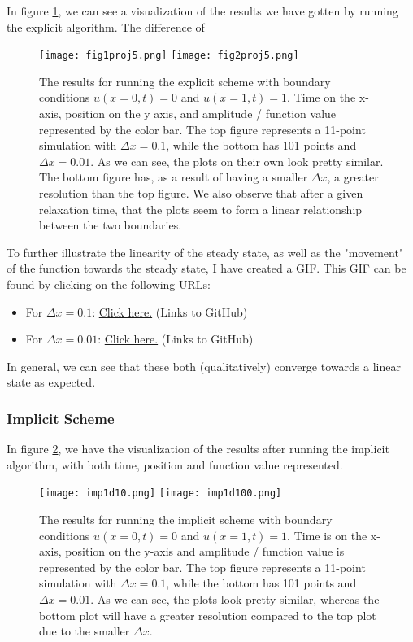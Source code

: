 \documentclass[reprint,english,notitlepage]{revtex4-1}  %
\begin{document}
In figure \ref{fig:1Dexplicit}, we can see a visualization of the results we have gotten by running the explicit algorithm. The difference of

\begin{figure}[h!]
    \centering
    \texttt{[image: fig1proj5.png]}
    \texttt{[image: fig2proj5.png]}
    \caption{The results for running the explicit scheme with boundary conditions $u(x=0,t) = 0$ and $u(x=1,t) = 1$. Time on the x-axis, position on the y axis, and amplitude / function value represented by the color bar. The top figure represents a 11-point simulation with $\Delta x = 0.1$, while the bottom has 101 points and $\Delta x = 0.01$. As we can see, the plots on their own look pretty similar. The bottom figure has, as a result of having a smaller $\Delta x$, a greater resolution than the top figure. We also observe that after a given relaxation time, that the plots seem to form a linear relationship between the two boundaries.}
    \label{fig:1Dexplicit}
\end{figure}

To further illustrate the linearity of the steady state, as well as the "movement" of the function towards the steady state, I have created a GIF. This GIF can be found by clicking on the following URLs:
\begin{itemize}
    \item For $\Delta x = 0.1$: \href{https://github.com/Jan-Egil/FYS3150/blob/master/Project5/Project5/GIF/expdelx10.gif}{Click here.} (Links to GitHub)
    \item For $\Delta x = 0.01$: \href{https://github.com/Jan-Egil/FYS3150/blob/master/Project5/Project5/GIF/expdelx100.gif}{Click here.} (Links to GitHub)
\end{itemize}

In general, we can see that these both (qualitatively) converge towards a linear state as expected.

\subsubsection{Implicit Scheme}

In figure \ref{fig:1Dimplicit}, we have the visualization of the results after running the implicit algorithm, with both time, position and function value represented.

\begin{figure}[h!]
    \centering
    \texttt{[image: imp1d10.png]}
    \texttt{[image: imp1d100.png]}    
    \caption{The results for running the implicit scheme with boundary conditions $u(x=0,t) = 0$ and $u(x=1,t) = 1$. Time is on the x-axis, position on the y-axis and amplitude / function value is represented by the color bar. The top figure represents a 11-point simulation with $\Delta x = 0.1$, while the bottom has 101 points and $\Delta x = 0.01$. As we can see, the plots look pretty similar, whereas the bottom plot will have a greater resolution compared to the top plot due to the smaller $\Delta x$.}
    \label{fig:1Dimplicit}
\end{figure}
\end{document}

